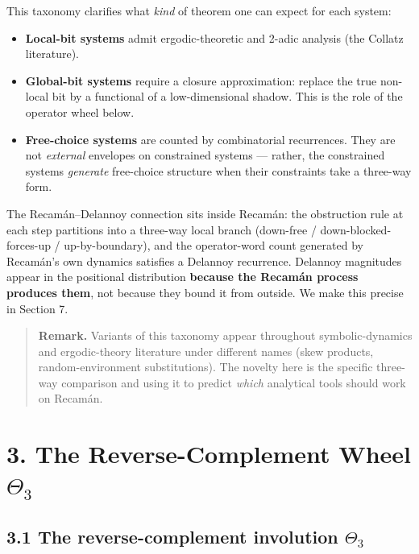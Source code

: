 \documentclass[
  11pt,
]{article}
\providecommand{\tightlist}{%
  \setlength{\itemsep}{0pt}\setlength{\parskip}{0pt}}
\begin{document}
This taxonomy clarifies what \emph{kind} of theorem one can expect for
each system:

\begin{itemize}
\tightlist
\item
  \textbf{Local-bit systems} admit ergodic-theoretic and 2-adic analysis
  (the Collatz literature).
\item
  \textbf{Global-bit systems} require a closure approximation: replace
  the true non-local bit by a functional of a low-dimensional shadow.
  This is the role of the operator wheel below.
\item
  \textbf{Free-choice systems} are counted by combinatorial recurrences.
  They are not \emph{external} envelopes on constrained systems ---
  rather, the constrained systems \emph{generate} free-choice structure
  when their constraints take a three-way form.
\end{itemize}

The Recamán--Delannoy connection sits inside Recamán: the obstruction
rule at each step partitions into a three-way local branch (down-free /
down-blocked-forces-up / up-by-boundary), and the operator-word count
generated by Recamán's own dynamics satisfies a Delannoy recurrence.
Delannoy magnitudes appear in the positional distribution
\textbf{because the Recamán process produces them}, not because they
bound it from outside. We make this precise in Section 7.

\begin{quote}
\textbf{Remark.} Variants of this taxonomy appear throughout
symbolic-dynamics and ergodic-theory literature under different names
(skew products, random-environment substitutions). The novelty here is
the specific three-way comparison and using it to predict \emph{which}
analytical tools should work on Recamán.
\end{quote}

\hypertarget{the-reverse-complement-wheel-theta_3}{%
\section{\texorpdfstring{3. The Reverse-Complement Wheel
\(\Theta_3\)}{3. The Reverse-Complement Wheel \textbackslash Theta\_3}}\label{the-reverse-complement-wheel-theta_3}}

\hypertarget{the-reverse-complement-involution-theta_3}{%
\subsection{\texorpdfstring{3.1 The reverse-complement involution
\(\Theta_3\)}{3.1 The reverse-complement involution \textbackslash Theta\_3}}\label{the-reverse-complement-involution-theta_3}}
\end{document}
